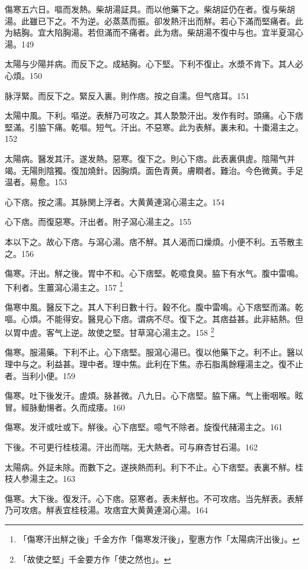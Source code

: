 \documentclass[12pt,twoside,UTF8,b5paper]{ctexbook}
\begin{document}
傷寒五六日。嘔而发熱。柴胡湯証具。而以他藥下之。柴胡証仍在者。復与柴胡湯。此雖已下之。不为逆。必蒸蒸而振。卻发熱汗出而觧。若心下滿而堅痛者。此为結胸。宜大陷胸湯。若但滿而不痛者。此为痞。柴胡{湯}不復中与也。宜半夏瀉心湯。149

太陽与少陽并病。而反下之。{成}結胸。心下堅。下利不{復}止。水漿不{肯}下。其人{必}心煩。150

脉浮緊。而反下之。緊反入裏。則作痞。按之自濡。但气痞耳。151

太陽中風。下利。嘔逆。表觧乃可攻之。其人漐漐汗出。发作有时。頭痛。心下痞堅滿。引脇下痛。乾嘔。短气。汗出。不惡寒。此为表觧。裏未和。十棗湯主之。152

太陽病。醫发其汗。遂发熱。惡寒。復下之。則心下痞。此表裏俱虗。陰陽气并竭。无陽則陰獨。復加燒針。因胸煩。面色青黄。膚瞤者。難治。今色微黄。手足温者。易愈。153

心下痞。按之濡。其脉関上浮者。大黄{黄連}瀉心湯主之。154

心下痞。而復惡寒。汗出者。附子瀉心湯主之。155

本以下之。故心下痞。与瀉心湯。痞不觧。其人渴而口燥{煩}。小便不利。五苓散主之。156

傷寒。汗出。觧之後。胃中不和。心下痞堅。乾噫食臭。脇下有水气。腹中雷鳴。下利者。生薑瀉心湯主之。157
	\footnote{「傷寒汗出觧之後」千金方作「傷寒发汗後」，聖惠方作「太陽病汗出後」。}

傷寒中風。醫反下之。其人下利日數十行。穀不化。腹中雷鳴。心下痞堅而滿。乾嘔。心煩。不能得安。醫見心下痞。谓病不尽。復下之。其痞益甚。此非結熱。但以胃中虗。客气上逆。故使之堅。甘草瀉心湯主之。158
	\footnote{「故使之堅」千金要方作「使之然也」。}

傷寒。服湯藥。下利不止。心下痞堅。服瀉心湯已。復以他藥下之。利不止。醫以理中与之。利益甚。理中者。理中焦。此利在下焦。赤石脂禹餘糧湯主之。復不止者。当利小便。159

傷寒。吐下{後}发汗。虗煩。脉甚微。八九日。心下痞堅。脇下痛。气上衝咽喉。眩冒。經脉動愓者。久而成痿。160

傷寒。发汗{或}吐{或}下。觧後。心下痞堅。噫气不除者。旋復代赭湯主之。161

下後。{不可更行桂枝湯。}汗出而喘。无大熱者。可与麻杏甘石湯。162

太陽病。外証未除。而數下之。遂挾熱而利。利下不止。心下痞堅。表裏不觧。桂枝人参湯主之。163

傷寒。大下後。復发汗。心下痞。惡寒者。表未觧也。不可攻痞。当先觧表。表觧乃可攻痞。觧表宜桂枝湯。攻痞宜大黄黄連瀉心湯。164
\end{document}
